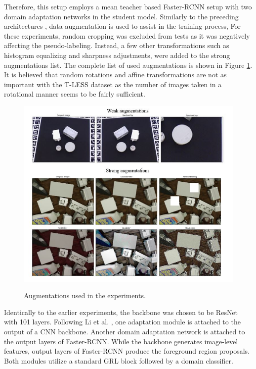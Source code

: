 Therefore, this setup employs a mean teacher based Faster-RCNN \cite{ima} setup with two domain adaptation networks in the student model. Similarly to the preceding architectures \cite{Li2021,Liu2021}, data augmentation is used to assist in the training process, For these experiments, random cropping was excluded from tests as it was negatively affecting the pseudo-labeling. Instead, a few other transformations such as histogram equalizing and sharpness adjustments, were added to the strong augmentations list. The complete list of used augmentations is shown in Figure \ref{newAugmentations}. It is believed that random rotations and affine transformations are not as important with the T-LESS dataset as the number of images taken in a rotational manner seems to be fairly sufficient.

\begin{figure}[htb]
	\begin{center}
		\includegraphics[width=16cm]{./Tless_augm.png}
	\end{center}
    \caption{Augmentations used in the experiments.}
	\begin{center}
		\label{newAugmentations}
	\end{center}
\end{figure}

Identically to the earlier experiments, the backbone was chosen to be ResNet \cite{He2015} with 101 layers. Following Li et al. \cite{Li2021}, one adaptation module is attached to the output of a CNN backbone.  Another domain adaptation network is attached to the output layers of Faster-RCNN. While the backbone generates image-level features, output layers of Faster-RCNN produce the foreground region proposals. Both modules utilize a standard GRL block \cite{Ganin2015} followed by a domain classifier.


